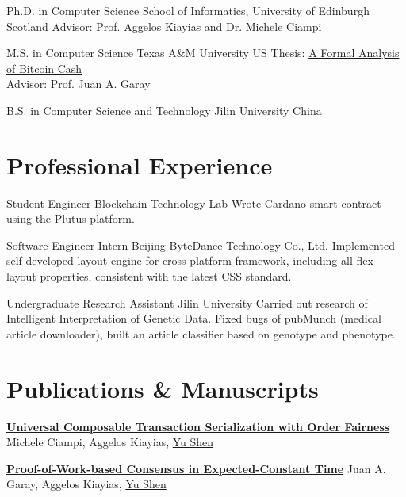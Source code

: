 \documentclass[11pt,a4paper,sans]{moderncv}
\begin{document}
{Ph.D. in Computer Science}
{School of Informatics, University of Edinburgh}
{Scotland}
{}
{Advisor: Prof. Aggelos Kiayias and Dr. Michele Ciampi}

{M.S. in Computer Science}
{Texas A\&M University}
{}
{US}
{Thesis: \href{https://oaktrust.library.tamu.edu/bitstream/handle/1969.1/195819/SHEN-THESIS-2021.pdf}{A Formal Analysis of Bitcoin Cash} \\Advisor: Prof. Juan A. Garay}

{B.S. in Computer Science and Technology}
{Jilin University}
{}
{China}
{}


\section{Professional Experience}

{Student Engineer}
{Blockchain Technology Lab}
{}
{}
{Wrote Cardano smart contract using the Plutus platform.}

{Software Engineer Intern}
{Beijing ByteDance Technology Co., Ltd.}
{}
{}
{Implemented self-developed layout engine for cross-platform framework, including all flex layout properties, consistent with the latest CSS standard.}

{Undergraduate Research Assistant}
{Jilin University}
{}
{}
{Carried out research of Intelligent Interpretation of Genetic Data. Fixed bugs of pubMunch (medical article downloader), built an article classifier based on genotype and phenotype.}


\section{Publications \& Manuscripts}

{\textbf{\href{https://eprint.iacr.org/2024/1296.pdf}{Universal Composable Transaction Serialization with Order Fairness}}}
{}
{}
{}
{\normalsize Michele Ciampi, Aggelos Kiayias, \underline{Yu Shen}}

{\textbf{\href{https://eprint.iacr.org/2023/1663.pdf}{Proof-of-Work-based Consensus in Expected-Constant Time}}}
{}
{}
{}
{\normalsize Juan A. Garay, Aggelos Kiayias, \underline{Yu Shen}}
\end{document}

